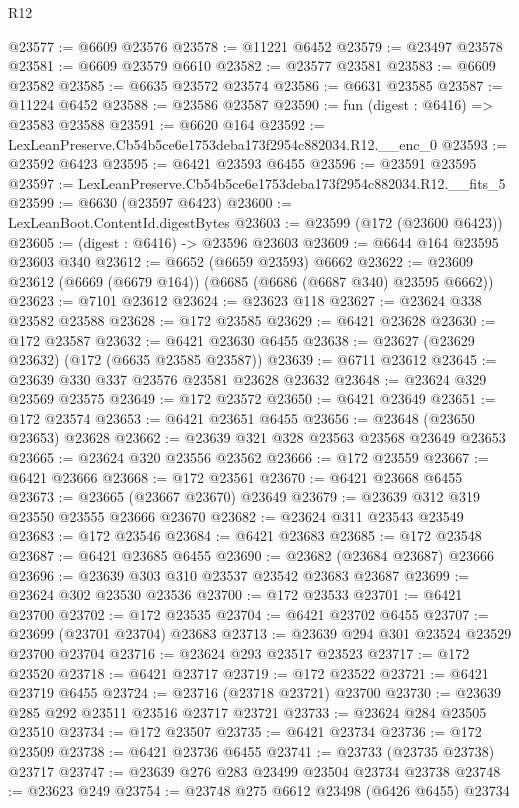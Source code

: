 \begin{lexlean}{R12}
\begin{coremodule}
@23577 := @6609 @23576
@23578 := @11221 @6452
@23579 := @23497 @23578
@23581 := @6609 @23579 @6610
@23582 := @23577 @23581
@23583 := @6609 @23582
@23585 := @6635 @23572 @23574
@23586 := @6631 @23585
@23587 := @11224 @6452
@23588 := @23586 @23587
@23590 := fun (digest : @6416) => @23583 @23588
@23591 := @6620 @164
@23592 := LexLeanPreserve.Cb54b5ce6e1753deba173f2954c882034.R12.__enc_0
@23593 := @23592 @6423
@23595 := @6421 @23593 @6455
@23596 := @23591 @23595
@23597 := LexLeanPreserve.Cb54b5ce6e1753deba173f2954c882034.R12.__fits_5
@23599 := @6630 (@23597 @6423)
@23600 := LexLeanBoot.ContentId.digestBytes
@23603 := @23599 (@172 (@23600 @6423))
@23605 := (digest : @6416) -> @23596 @23603
@23609 := @6644 @164 @23595 @23603 @340
@23612 := @6652 (@6659 @23593) @6662
@23622 := @23609 @23612 (@6669 (@6679 @164)) (@6685 (@6686 (@6687 @340) @23595 @6662))
@23623 := @7101 @23612
@23624 := @23623 @118
@23627 := @23624 @338 @23582 @23588
@23628 := @172 @23585
@23629 := @6421 @23628
@23630 := @172 @23587
@23632 := @6421 @23630 @6455
@23638 := @23627 (@23629 @23632) (@172 (@6635 @23585 @23587))
@23639 := @6711 @23612
@23645 := @23639 @330 @337 @23576 @23581 @23628 @23632
@23648 := @23624 @329 @23569 @23575
@23649 := @172 @23572
@23650 := @6421 @23649
@23651 := @172 @23574
@23653 := @6421 @23651 @6455
@23656 := @23648 (@23650 @23653) @23628
@23662 := @23639 @321 @328 @23563 @23568 @23649 @23653
@23665 := @23624 @320 @23556 @23562
@23666 := @172 @23559
@23667 := @6421 @23666
@23668 := @172 @23561
@23670 := @6421 @23668 @6455
@23673 := @23665 (@23667 @23670) @23649
@23679 := @23639 @312 @319 @23550 @23555 @23666 @23670
@23682 := @23624 @311 @23543 @23549
@23683 := @172 @23546
@23684 := @6421 @23683
@23685 := @172 @23548
@23687 := @6421 @23685 @6455
@23690 := @23682 (@23684 @23687) @23666
@23696 := @23639 @303 @310 @23537 @23542 @23683 @23687
@23699 := @23624 @302 @23530 @23536
@23700 := @172 @23533
@23701 := @6421 @23700
@23702 := @172 @23535
@23704 := @6421 @23702 @6455
@23707 := @23699 (@23701 @23704) @23683
@23713 := @23639 @294 @301 @23524 @23529 @23700 @23704
@23716 := @23624 @293 @23517 @23523
@23717 := @172 @23520
@23718 := @6421 @23717
@23719 := @172 @23522
@23721 := @6421 @23719 @6455
@23724 := @23716 (@23718 @23721) @23700
@23730 := @23639 @285 @292 @23511 @23516 @23717 @23721
@23733 := @23624 @284 @23505 @23510
@23734 := @172 @23507
@23735 := @6421 @23734
@23736 := @172 @23509
@23738 := @6421 @23736 @6455
@23741 := @23733 (@23735 @23738) @23717
@23747 := @23639 @276 @283 @23499 @23504 @23734 @23738
@23748 := @23623 @249
@23754 := @23748 @275 @6612 @23498 (@6426 @6455) @23734

\end{coremodule}
\end{lexlean}
